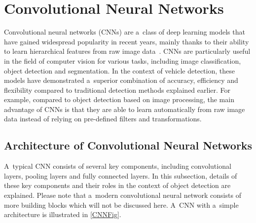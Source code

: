 



\section{Convolutional Neural Networks}
\label{CNNs}

Convolutional neural networks (CNNs) are a~class of deep learning models that
have gained widespread popularity in recent years, mainly thanks to their
ability to learn hierarchical features from raw image data~\cite{Li2022}. CNNs
are particularly useful in the field of computer vision for various tasks,
including image classification, object detection and segmentation. In the
context of vehicle detection, these models have demonstrated a~superior
combination of accuracy, efficiency and flexibility compared to traditional
detection methods explained earlier. For example, compared to object detection
based on image processing, the main advantage of CNNs is that they are able to
learn automatically from raw image data instead of relying on pre-defined
filters and transformations.


\subsection{Architecture of Convolutional Neural Networks}

A~typical CNN consists of several key components, including convolutional
layers, pooling layers and fully connected layers. In this subsection, details
of these key components and their roles in the context of object detection are
explained. Please note that a~modern convolutional neural network consists of
more building blocks which will not be discussed here. A~CNN with a~simple
architecture is illustrated in \autoref{CNNFig}.

